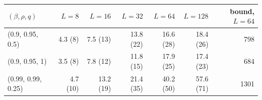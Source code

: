 \begin{tabular}{lrrrrrr}
\toprule
$(\beta,\rho,q)$ & $L=8$ & $L=16$ & $L=32$ & $L=64$ & $L=128$ & bound, $L=64$\\
\midrule
(0.9, 0.95, 0.5) & 4.3 (8) & 7.5 (13) & 13.8 (22) & 16.6 (28) & 18.4 (26) & 798\\
(0.9, 0.95, 1) & 3.5 (8) & 7.8 (12) & 11.8 (15) & 17.9 (25) & 17.4 (23) & 684\\
(0.99, 0.99, 0.25) & 4.7 (10) & 13.2 (19) & 21.4 (35) & 40.2 (50) & 57.6 (71) & 1301\\
\bottomrule
\end{tabular}
